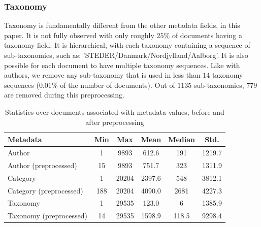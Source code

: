 \subsubsection{Taxonomy}\label{subsec:appendix_taxonomy}
Taxonomy is fundamentally different from the other metadata fields, in this paper.
It is not fully observed with only roughly $25\%$ of documents having a taxonomy field.
It is hierarchical, with each taxonomy containing a sequence of sub-taxonomies, such as: 'STEDER/Danmark/Nordjylland/Aalborg'.
It is also possible for each document to have multiple taxonomy sequences.
Like with authors, we remove any sub-taxonomy that is used in less than $14$ taxonomy sequences ($0.01\%$ of the number of documents).
Out of $1135$ sub-taxonomies, $779$ are removed during this preprocessing.

\begin{table}
	\centering
	\begin{tabular}{l | c | c | c | c | c}
		Metadata & Min & Max & Mean & Median & Std. \\
		\hline
		Author & 1 & 9893 & 612.6 & 191 & 1219.7 \\
		Author (preprocessed) & 15 & 9893 & 751.7 & 323 & 1311.9 \\
		Category & 1 & 20204 & 2397.6 & 548 & 3812.1 \\
		Category (preprocessed) & 188 & 20204 & 4090.0 & 2681 & 4227.3 \\
		Taxonomy & 1 & 29535 & 123.0 & 6 & 1385.9 \\
		Taxonomy (preprocessed) & 14 & 29535 & 1598.9 & 118.5 & 9298.4 \\
	\end{tabular}
	\caption{Statistics over documents associated with metadata values, before and after preprocessing}
	\label{tab:meta_prepro_stats}
\end{table}
